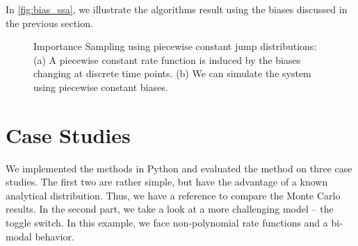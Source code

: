 In \autoref{fig:bias_ssa}, we illustrate the algorithms result using the biases discussed in the previous section.
\begin{figure}
    \centering
    \caption[Piecewise constant jump distributions \& biased SSA]{Importance Sampling using piecewise constant jump distributions: (a) A piecewise constant rate function is induced by the biases changing at discrete time points. (b) We can simulate the system using piecewise constant biases.}
\end{figure}


\section{Case Studies}
We implemented the methods in Python and evaluated the method on three case studies.
The first two are rather simple, but have the advantage of a known analytical distribution.
Thus, we have a reference to compare the Monte Carlo results.
In the second part, we take a look at a more challenging model -- the toggle switch.
In this example, we face non-polynomial rate functions and a bi-modal behavior.
